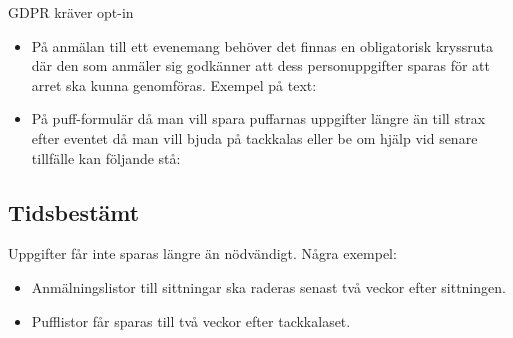 GDPR kräver opt-in
\begin{itemize}
    \item På anmälan till ett evenemang behöver det finnas en obligatorisk kryssruta där den som anmäler sig godkänner att dess personuppgifter sparas för att arret ska kunna genomföras. Exempel på text:\\
    
    \noindent{}
    
    \item På puff-formulär då man vill spara puffarnas uppgifter längre än till strax efter eventet då man vill bjuda på tackkalas eller be om hjälp vid senare tillfälle kan följande stå:\\
    
    \noindent{}
\end{itemize}

\subsection{Tidsbestämt}

Uppgifter får inte sparas längre än nödvändigt. Några exempel:

\begin{itemize}
    \item Anmälningslistor till sittningar ska raderas senast två veckor efter sittningen.
    \item Pufflistor får sparas till två veckor efter tackkalaset.
\end{itemize}

